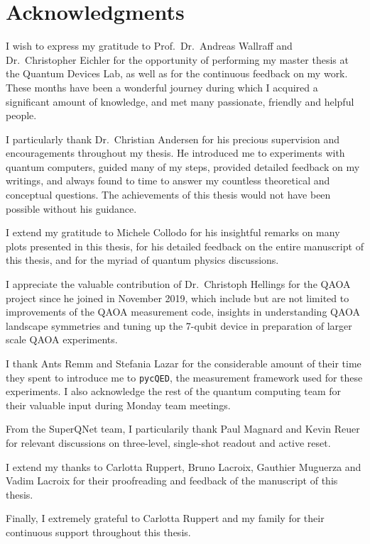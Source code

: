\chapter{Acknowledgments}
I wish to express my gratitude to Prof.~Dr.~Andreas Wallraff and Dr.~Christopher Eichler for the opportunity of performing my master thesis at the Quantum Devices Lab, as well as for the continuous feedback on my work. These months have been a wonderful journey during which I acquired a significant amount of knowledge, and met many passionate, friendly and helpful people.

I particularly thank Dr.~Christian Andersen for his precious supervision and encouragements throughout my thesis. He introduced me to experiments with quantum computers, guided many of my steps, provided detailed feedback on my writings, and always found to time to answer my countless theoretical and conceptual questions. The achievements of this thesis would not have been possible without his guidance.

I extend my gratitude to Michele Collodo for his insightful remarks on many plots presented in this thesis, for his detailed feedback on the entire manuscript of this thesis, and for the myriad of quantum physics discussions. 

I appreciate the valuable contribution of Dr.~Christoph Hellings for the QAOA project since he joined in November 2019, which include but are not limited to improvements of the QAOA measurement code, insights in understanding QAOA landscape symmetries and tuning up the 7-qubit device in preparation of larger scale QAOA experiments.

I thank Ants Remm and Stefania Lazar for the considerable amount of their time they spent to introduce me to \texttt{pycQED}, the measurement framework used for these experiments. I also acknowledge the rest of the quantum computing team for their valuable input during Monday team meetings.

From the SuperQNet team, I particularily thank Paul Magnard and Kevin Reuer for relevant discussions on three-level, single-shot readout and active reset.

I extend my thanks to Carlotta Ruppert, Bruno Lacroix, Gauthier Muguerza and Vadim Lacroix for their proofreading and feedback of the manuscript of this thesis.

Finally, I extremely grateful to Carlotta Ruppert and my family for their continuous support throughout this thesis.